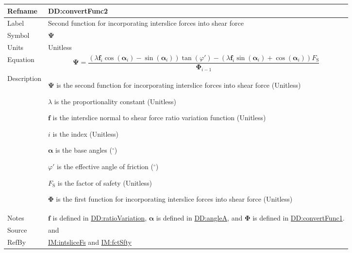 \documentclass[12pt]{article}
\begin{document}
\medskip
\noindent
\begin{minipage}{\textwidth}
\begin{tabular}{>{\raggedright}p{}>{\raggedright\arraybackslash}p{}}
\toprule \textbf{Refname} & \textbf{DD:convertFunc2}
\label{DD:convertFunc2}
\\ \midrule
Label & Second function for incorporating interslice forces into shear force
        
\\ \midrule
Symbol & $\symbf{Ψ}$
         
\\ \midrule
Units & Unitless
        
\\ \midrule
Equation & \begin{displaymath}
           \symbf{Ψ}=\frac{\left(λ {\symbf{f}}_{i} \cos\left({\symbf{α}}_{i}\right)-\sin\left({\symbf{α}}_{i}\right)\right) \tan\left(φ'\right)-\left(λ {\symbf{f}}_{i} \sin\left({\symbf{α}}_{i}\right)+\cos\left({\symbf{α}}_{i}\right)\right) {F_{\text{S}}}}{{\symbf{Φ}}_{i-1}}
           \end{displaymath}
\\ \midrule
Description & \begin{symbDescription}
              \item{$\symbf{Ψ}$ is the second function for incorporating interslice forces into shear force (Unitless)}
              \item{$λ$ is the proportionality constant (Unitless)}
              \item{$\symbf{f}$ is the interslice normal to shear force ratio variation function (Unitless)}
              \item{$i$ is the index (Unitless)}
              \item{$\symbf{α}$ is the base angles (${{}^{\circ}}$)}
              \item{$φ'$ is the effective angle of friction (${{}^{\circ}}$)}
              \item{${F_{\text{S}}}$ is the factor of safety (Unitless)}
              \item{$\symbf{Φ}$ is the first function for incorporating interslice forces into shear force (Unitless)}
              \end{symbDescription}
\\ \midrule
Notes & $\symbf{f}$ is defined in \hyperref[DD:ratioVariation]{DD:ratioVariation}, $\symbf{α}$ is defined in \hyperref[DD:angleA]{DD:angleA}, and $\symbf{Φ}$ is defined in \hyperref[DD:convertFunc1]{DD:convertFunc1}.
        
\\ \midrule
Source & \cite{chen2005} and \cite{karchewski2012}
         
\\ \midrule
RefBy & \hyperref[IM:intsliceFs]{IM:intsliceFs} and \hyperref[IM:fctSfty]{IM:fctSfty}
        
\\ \bottomrule
\end{tabular}
\end{minipage}
\end{document}
